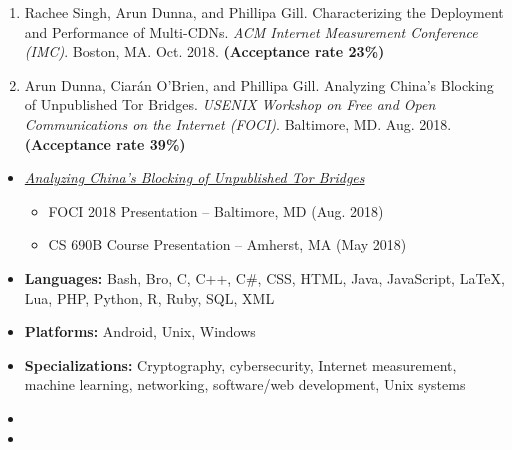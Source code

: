 
\begin{enumerate}
 \item Rachee Singh, Arun Dunna, and Phillipa Gill. Characterizing the Deployment and Performance of Multi-CDNs. \textit{ACM Internet Measurement Conference (IMC)}. Boston, MA. Oct. 2018. \textbf{(Acceptance rate 23\%)}
 \item Arun Dunna, Ciar\'an O'Brien, and Phillipa Gill. Analyzing China's Blocking of Unpublished Tor Bridges. \textit{USENIX Workshop on Free and Open Communications on the Internet (FOCI)}. Baltimore, MD. Aug. 2018. \textbf{(Acceptance rate 39\%)}
\end{enumerate}


\begin{itemize}
\item
    {\it \href{https://adunna.me/foci-2018-tor/}{Analyzing China's Blocking of Unpublished Tor Bridges}}
    \begin{itemize}
        \item FOCI 2018 Presentation -- Baltimore, MD (Aug. 2018)
        \item CS 690B Course Presentation -- Amherst, MA (May 2018)
    \end{itemize}

\end{itemize}

\newpage


\begin{itemize}
\item \textbf{Languages:} Bash, Bro, C, C++, C\#, CSS, HTML, Java, JavaScript, LaTeX, Lua, PHP, Python, R, Ruby, SQL, XML
    \item \textbf{Platforms:}
Android, Unix, Windows
        \item \textbf{Specializations:}
    Cryptography, cybersecurity, Internet measurement, machine learning, networking, software/web development, Unix systems

\end{itemize}


\begin{itemize}
\item
\item
\end{itemize}

